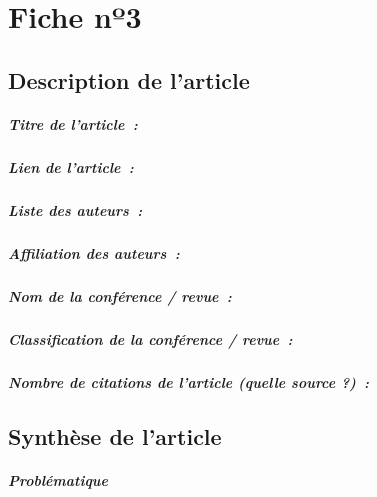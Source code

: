 
\chapter{Fiche nº3} %
\label{app:Fiche3} %

\section{Description de l'article}

\paragraph{Titre de l'article~:}
\paragraph{Lien de l'article~:}
\paragraph{Liste des auteurs~:}
\paragraph{Affiliation des auteurs~:}
\paragraph{Nom de la conférence / revue~:}
\paragraph{Classification de la conférence / revue~:}
\paragraph{Nombre de citations de l'article (quelle source ?)~:}



\section{Synthèse de l'article}

\paragraph{Problématique}
\lipsum[1]

